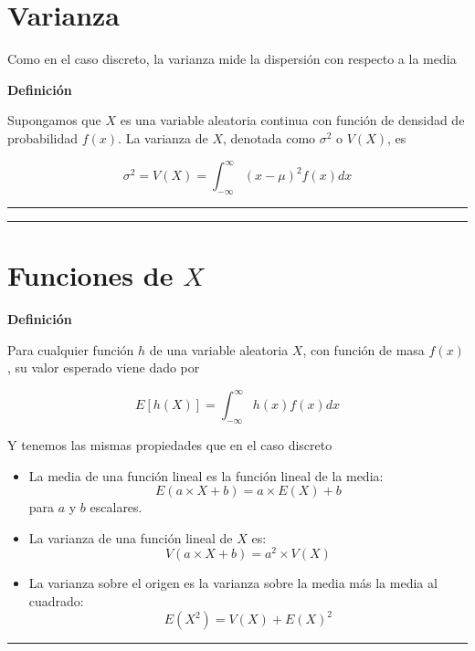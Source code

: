 \documentclass[
]{book}
\begin{document}
\hypertarget{varianza}{%
\section{Varianza}\label{varianza}}

Como en el caso discreto, la varianza mide la dispersión con respecto a la media

\textbf{Definición}

Supongamos que \(X\) es una variable aleatoria continua con función de densidad de probabilidad \(f(x)\). La varianza de \(X\), denotada como \(\sigma^2\) o \(V(X)\), es

\[\sigma^2=V(X)=\int_{-\infty}^\infty (x-\mu)^2 f(x) dx\]

\begin{center}\rule{0.5\linewidth}{0.5pt}\end{center}

\begin{center}\rule{0.5\linewidth}{0.5pt}\end{center}

\hypertarget{funciones-de-x-1}{%
\section{\texorpdfstring{Funciones de \(X\)}{Funciones de X}}\label{funciones-de-x-1}}

\textbf{Definición}

Para cualquier función \(h\) de una variable aleatoria \(X\), con función de masa \(f(x)\), su valor esperado viene dado por

\[E[h(X)]= \int_{-\infty}^{\infty} h(x) f(x)dx\]

Y tenemos las mismas propiedades que en el caso discreto

\begin{itemize}
\item
  La media de una función lineal es la función lineal de la media: \[E(a\times X +b)= a\times E(X) +b\] para \(a\) y \(b\) escalares.
\item
  La varianza de una función lineal de \(X\) es:\[V(a\times X +b)= a^2\times V(X)\]
\item
  La varianza sobre el origen es la varianza sobre la media más la media al cuadrado: \[E(X^2)=V(X)+E(X)^2\]
\end{itemize}

\begin{center}\rule{0.5\linewidth}{0.5pt}\end{center}
\end{document}
